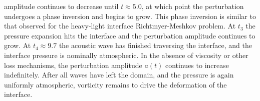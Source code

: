 amplitude continues to decrease until $t\approx 5.0$, at which point
the perturbation undergoes a phase inversion and begins to grow. This
phase inversion is similar to that observed for the heavy-light
interface Richtmyer-Meshkov problem. At $t_3$ the pressure expansion
hits the interface and the perturbation amplitude continues to
grow. At $t_4\approx9.7$ the acoustic wave has finished traversing the
interface, and the interface pressure is nominally atmospheric. In the
absence of viscosity or other loss mechanisms, the perturbation
amplitude $a(t)$ continues to increase indefinitely. After all waves
have left the domain, and the pressure is again uniformly atmospheric,
vorticity remains to drive the deformation of the interface.
% 
% 
